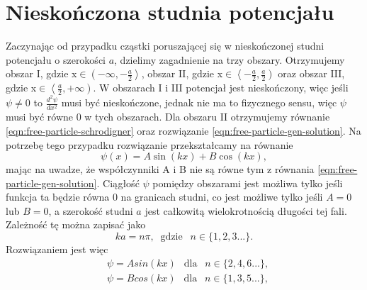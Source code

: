 \documentclass{SGGW-thesis}
\begin{document}
	\section{Nieskończona studnia potencjału}
	Zaczynając od przypadku cząstki poruszającej się w nieskończonej studni potencjału o szerokości $a$, dzielimy zagadnienie na trzy obszary. Otrzymujemy obszar I, gdzie x$\in\left(-\infty,-\frac{a}{2}\right>$, obszar II, gdzie x$\in\left<-\frac{a}{2}, \frac{a}{2}\right)$ oraz obszar III, gdzie x$\in\left<\frac{a}{2}, +\infty\right)$. W obszarach I i III potencjał jest nieskończony, więc jeśli $\psi\neq0$ to $\frac{d^2\psi}{dx^2}$ musi być nieskończone, jednak nie ma to fizycznego sensu, więc $\psi$ musi być równe 0 w tych obszarach. Dla obszaru II otrzymujemy równanie \ref{eqn:free-particle-schrodigner} oraz rozwiązanie \ref{eqn:free-particle-gen-solution}. Na potrzebę tego przypadku rozwiązanie przekształcamy na równanie
	\begin{equation}
	\psi(x) = A\sin(kx) + B\cos(kx),
	\end{equation}
mając na uwadze, że współczynniki A i B nie są równe tym z równania \ref{eqn:free-particle-gen-solution}. Ciągłość $\psi$ pomiędzy obszarami jest możliwa tylko jeśli funkcja ta będzie równa 0 na granicach studni, co jest możliwe tylko jeśli $A=0$ lub $B=0$, a szerokość studni $a$ jest całkowitą wielokrotnością długości tej fali. Zależność tę można zapisać jako
	\begin{equation}\label{eqn:discrete-well}
	ka=n\pi, \;\;\textrm{gdzie}\;\;\ n\in\{1, 2, 3...\}.
	\end{equation}
Rozwiązaniem jest więc
	\begin{equation}\label{eqn:well-inside-sol}
	\begin{split}
		&\psi = Asin(kx) \;\;\ \textrm{dla} \;\;\ n\in\{2, 4, 6...\}, \\
		&\psi = Bcos(kx) \;\;\ \textrm{dla} \;\;\ n\in\{1, 3, 5...\},
	\end{split}
	\end{equation}
\end{document}
